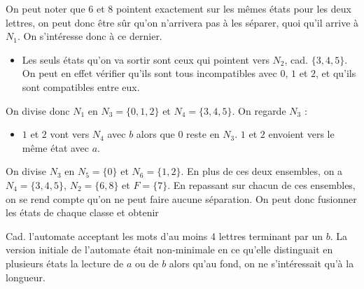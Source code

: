 \begin{correction*}
On peut noter que $6$ et $8$ pointent exactement sur les mêmes états pour les deux lettres, on peut donc être sûr qu'on n'arrivera pas à les séparer, quoi qu'il arrive à $N_1$. On s'intéresse donc à ce dernier.

\begin{itemize}

\item Les seuls états qu'on va sortir sont ceux qui pointent vers $N_2$, cad. $\{3,4,5\}$. On peut en effet vérifier qu'ils sont tous incompatibles avec $0$, $1$ et $2$, et qu'ils sont compatibles entre eux.

\end{itemize}


On divise donc $N_1$ en $N_3 = \{0,1,2\}$ et $N_4 = \{3,4,5\}$. On regarde $N_3$ :

\begin{itemize}

\item $1$ et $2$ vont vers $N_4$ avec $b$ alors que $0$ reste en $N_3$. $1$ et $2$ envoient vers le même état avec $a$. 
\end{itemize}

On divise $N_3$ en $N_5 = \{0\}$ et $N_6 = \{1,2\}$. En plus de ces deux ensembles, on a $N_4 = \{3,4,5\}$, $N_2 = \{6,8\}$ et $F = \{7\}$.
En repassant sur chacun de ces ensembles, on se rend compte qu'on ne peut faire aucune séparation. On peut donc fusionner les états de chaque classe et obtenir 


\begin{figure}[!ht]
\centering
{}
\end{figure}

Cad. l'automate acceptant les mots d'au moins 4 lettres terminant par un $b$. La version initiale de l'automate était non-minimale en ce qu'elle distinguait en plusieurs états la lecture de $a$ ou de $b$ alors qu'au fond, on ne s'intéressait qu'à la longueur.

\end{correction*}

